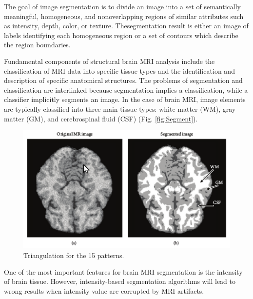 The goal of image segmentation is to divide an image into a set of
semantically meaningful, homogeneous, and nonoverlapping regions of
similar attributes such as intensity, depth, color, or texture. Thesegmentation
result is either an image of labels identifying each homogeneous region
or a set of contours which describe the region boundaries.

Fundamental components of structural brain MRI analysis include the
classification of MRI data into specific tissue types and the identification
and description of specific anatomical structures. The problems of
segmentation and classification are interlinked because segmentation
implies a classification, while a classifier implicitly segments an
image. In the case of brain MRI, image elements are typically classified
into three main tissue types: white matter (WM), gray matter (GM),
and cerebrospinal fluid (CSF) (Fig. \ref{fig:Segment}).

\begin{figure}[H]
\centering{}\includegraphics[scale=0.7]{figures/9Segmentation}\caption{Triangulation for the 15 patterns. \label{figures/fig:Segment}}
\end{figure}

One of the most important features for brain MRI segmentation is the
intensity of brain tissue. However, intensity-based segmentation algorithms
will lead to wrong results when intensity value are corrupted by MRI
artifacts.

